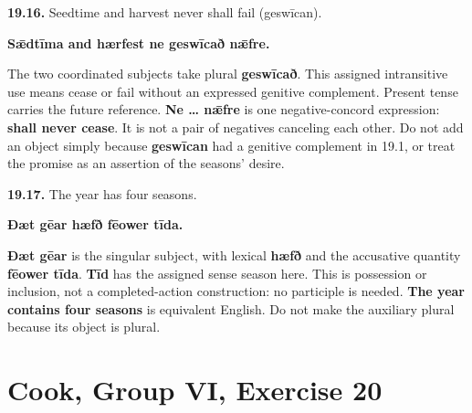 \par\begin{minipage}{\linewidth}\raggedright
\textbf{19.16.} Seedtime and harvest never shall fail (geswīcan).

\textbf{Sǣdtīma and hærfest ne geswīcað nǣfre.}

The two coordinated subjects take plural \textbf{geswīcað}. This assigned intransitive use means cease or fail without an expressed genitive complement. Present tense carries the future reference. \textbf{Ne … nǣfre} is one negative-concord expression: \textbf{shall never cease}. It is not a pair of negatives canceling each other. Do not add an object simply because \textbf{geswīcan} had a genitive complement in 19.1, or treat the promise as an assertion of the seasons' desire.

\end{minipage}\par\addvspace{4pt}

\par\begin{minipage}{\linewidth}\raggedright
\textbf{19.17.} The year has four seasons.

\textbf{Ðæt gēar hæfð fēower tīda.}

\textbf{Ðæt gēar} is the singular subject, with lexical \textbf{hæfð} and the accusative quantity \textbf{fēower tīda}. \textbf{Tīd} has the assigned sense season here. This is possession or inclusion, not a completed-action construction: no participle is needed. \textbf{The year contains four seasons} is equivalent English. Do not make the auxiliary plural because its object is plural.

\end{minipage}\par\addvspace{4pt}

\section*{Cook, Group VI, Exercise 20}

